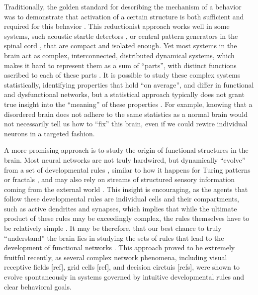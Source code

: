 \documentclass{article}
\begin{document}
Traditionally, the golden standard for describing the mechanism of a behavior was to demonstrate that activation of a certain structure is both sufficient and required for this behavior \citep{krakauer2017reductionist}. This reductionist approach works well in some systems, such acoustic startle detectors \citep{korn2005mauthner}, or central pattern generators in the spinal cord \citep{roberts2010hatchling}, that are compact and isolated enough. Yet most systems in the brain act as complex, interconnected, distributed dynamical systems, which makes it hard to represent them as a sum of “parts”, with distinct functions ascribed to each of these parts \citep{gao2015simplicity}. It is possible to study these complex systems statistically, identifying properties that hold “on average”, and differ in functional and dysfunctional networks, but a statistical approach typically does not grant true insight into the “meaning” of these properties \citep{bassett2018models}. For example, knowing that a disordered brain does not adhere to the same statistics as a normal brain would not necessarily tell us how to “fix” this brain, even if we could rewire individual neurons in a targeted fashion.

A more promising approach is to study the origin of functional structures in the brain. Most neural networks are not truly hardwired, but dynamically “evolve” from a set of developmental rules \citep{pietri2017emergence}, similar to how it happens for Turing patterns or fractals \citep{lefevre2010reaction,bullmore2012economy}, and may also rely on streams of structured sensory information coming from the external world \citep{gao2015simplicity}. This insight is encouraging, as the agents that follow these developmental rules are individual cells and their compartments, such as active dendrites and synapses, which implies that while the ultimate product of these rules may be exceedingly complex, the rules themselves have to be relatively simple \citep{bassett2018models}. It may be therefore, that our best chance to truly “understand” the brain lies in studying the sets of rules that lead to the development of functional networks \citep{linderman2017constrain}. This approach proved to be extremely fruitful recently, as several complex network phenomena, including visual receptive fields [ref], grid cells [ref], and decision circtuis [refs]\citep{haesemeyer2018convergent}, were shown to evolve spontaneously in systems governed by intuitive developmental rules and clear behavioral goals. 
\end{document}
